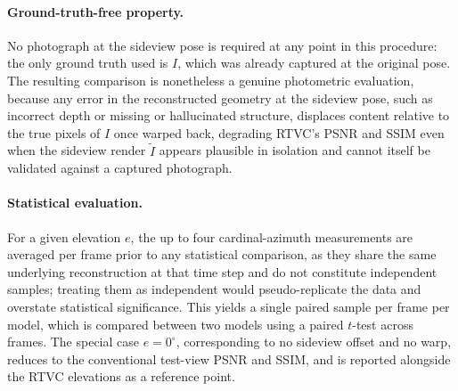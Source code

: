 \paragraph{Ground-truth-free property.}
No photograph at the sideview pose is required at any point in this
procedure: the only ground truth used is $I$, which was already captured
at the original pose. The resulting comparison is nonetheless a genuine
photometric evaluation, because any error in the reconstructed geometry at
the sideview pose, such as incorrect depth or missing or hallucinated
structure, displaces content relative to the true pixels of $I$ once
warped back, degrading RTVC's PSNR and SSIM even when the sideview render
$\tilde{I}$ appears plausible in isolation and cannot itself be validated
against a captured photograph.

\paragraph{Statistical evaluation.}
For a given elevation $e$, the up to four cardinal-azimuth measurements are
averaged per frame prior to any statistical comparison, as they share the
same underlying reconstruction at that time step and do not constitute
independent samples; treating them as independent would pseudo-replicate
the data and overstate statistical significance. This yields a single
paired sample per frame per model, which is compared between two models
using a paired $t$-test across frames. The special case $e = 0^\circ$,
corresponding to no sideview offset and no warp, reduces to the
conventional test-view PSNR and SSIM, and is reported alongside the RTVC
elevations as a reference point.
